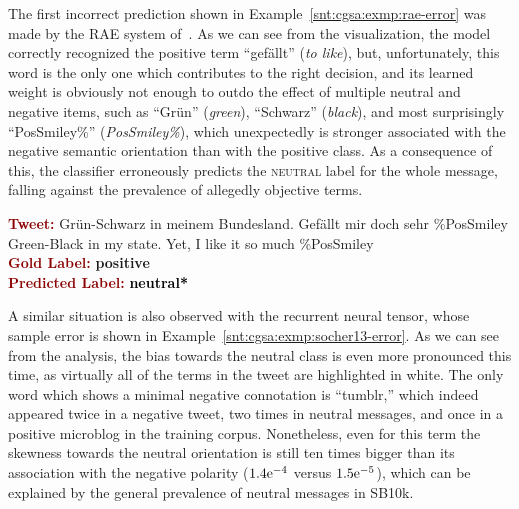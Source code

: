The first incorrect prediction shown in
Example~\ref{snt:cgsa:exmp:rae-error} was made by the RAE system
of~\citet{Socher:11}.  As we can see from the visualization, the model
correctly recognized the positive term ``gef\"allt'' (\emph{to like}),
but, unfortunately, this word is the only one which contributes to the
right decision, and its learned weight is obviously not enough to
outdo the effect of multiple neutral and negative items, such as
``Gr\"un'' (\emph{green}), ``Schwarz'' (\emph{black}), and most
surprisingly ``PosSmiley\%'' (\emph{PosSmiley\%}), which unexpectedly
is stronger associated with the negative semantic orientation than
with the positive class.  As a consequence of this, the classifier
erroneously predicts the \textsc{neutral} label for the whole message,
falling against the prevalence of allegedly objective terms.

\begin{example}\label{snt:cgsa:exmp:rae-error}
  \noindent\textup{\bfseries\textcolor{darkred}{Tweet:}} {\upshape
    \colorbox{white!5}{Gr\"un}\colorbox{blue!11}{-}\colorbox{white!25.7}{Schwarz}
    \colorbox{white!5}{in} \colorbox{white!2.5!blue!1}{meinem}
    Bundesland. \colorbox{green!10}{Gef\"allt}
    \colorbox{white!5!blue!4.5}{mir} \colorbox{white!5!blue!5}{doch}
    \colorbox{white!4.6!blue!5}{sehr}
    \colorbox{white!5!blue!5}{\%PosSmiley}}\\
  \noindent \colorbox{white!5}{Green}\colorbox{blue!11}{-}\colorbox{white!25.7}{Black} \colorbox{white!5}{in} \colorbox{white!2.5!blue!1}{my} state.  \colorbox{white!5!blue!5}{Yet}, \colorbox{white!5!blue!4.5}{I} \colorbox{green!10}{like} it \colorbox{white!4.6!blue!5}{so much} \colorbox{white!5!blue!5}{\%PosSmiley}\\[\exampleSep]
  \noindent\textup{\bfseries\textcolor{darkred}{Gold Label:}}\hspace*{4.3em}\textbf{%
    \upshape\textcolor{green3}{positive}}\\
 \noindent\textup{\bfseries\textcolor{darkred}{Predicted Label:}}\hspace*{2em}\textbf{%
    \upshape\textcolor{black}{neutral*}}
\end{example}

A similar situation is also observed with the recurrent neural tensor,
whose sample error is shown in
Example~\ref{snt:cgsa:exmp:socher13-error}.  As we can see from the
analysis, the bias towards the neutral class is even more pronounced
this time, as virtually all of the terms in the tweet are highlighted
in white.  The only word which shows a minimal negative connotation is
``tumblr,'' which indeed appeared twice in a negative tweet, two times
in neutral messages, and once in a positive microblog in the training
corpus.  Nonetheless, even for this term the skewness towards the
neutral orientation is still ten times bigger than its association
with the negative polarity (${1.4}\mathrm{e}^{-4}$ versus
${1.5}\mathrm{e}^{-5}$), which can be explained by the general
prevalence of neutral messages in SB10k.

